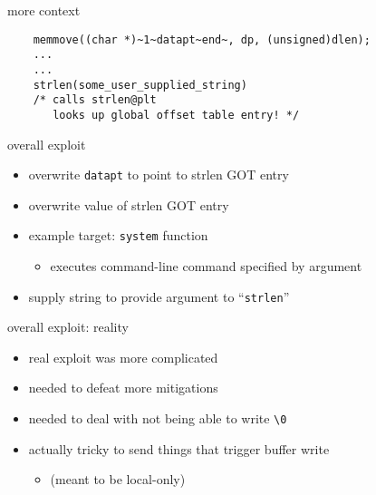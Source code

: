 \begin{frame}[fragile,label=moreContext]{more context}
\begin{lstlisting}
    memmove((char *)~1~datapt~end~, dp, (unsigned)dlen);
    ...
    ...
    strlen(some_user_supplied_string)
    /* calls strlen@plt
       looks up global offset table entry! */
\end{lstlisting}
\end{frame}


\begin{frame}{overall exploit}
    \begin{itemize}
    \item overwrite {\tt datapt} to point to strlen GOT entry
    \item overwrite value of strlen GOT entry
    \item example target: {\tt system} function
            \begin{itemize}
                \item executes command-line command specified by argument
            \end{itemize}
    \item supply string to provide argument to ``{\tt strlen}''
    \end{itemize}
\end{frame}


\begin{frame}{overall exploit: reality}
    \begin{itemize}
    \item real exploit was more complicated
    \item needed to defeat more mitigations
    \item needed to deal with not being able to write {\tt \textbackslash 0}
    \item actually tricky to send things that trigger buffer write
        \begin{itemize}
        \item (meant to be local-only)
        \end{itemize}
    \end{itemize}
\end{frame}


